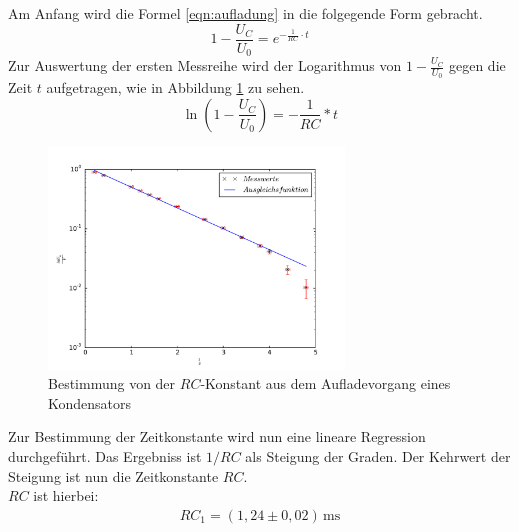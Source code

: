 Am Anfang wird die Formel \eqref{eqn:aufladung} in die folgegende
Form gebracht.
\begin{equation}
1-\frac{U_C}{U_0}=e^{-{\frac{1}{RC}\cdot t}}
\end{equation}
Zur Auswertung der ersten Messreihe wird der Logarithmus
von $1-\frac{U_C}{U_0}$ gegen die Zeit $t$ aufgetragen, wie in Abbildung \ref{abb:a} zu sehen.
\begin{equation}
  \ln \left(1-\frac{U_C}{U_0}\right)=-\frac{1}{RC}*t
\end{equation}
\begin{figure}[!h]
  \centering
  \includegraphics[width=0.7\textwidth]{a.pdf}
  \caption{Bestimmung von der $RC$-Konstant aus dem
  Aufladevorgang eines Kondensators}
\label{abb:a}
\end{figure}
\FloatBarrier
Zur Bestimmung der Zeitkonstante wird nun eine lineare Regression durchgeführt.
Das Ergebniss ist $1/RC$ als Steigung der Graden.
Der Kehrwert der Steigung ist nun die Zeitkonstante $RC$.\\
$RC$ ist hierbei:
\begin{align*}
RC_\mathrm{1}=(1,24\pm0,02)\,\si{\milli\second}
\end{align*}
